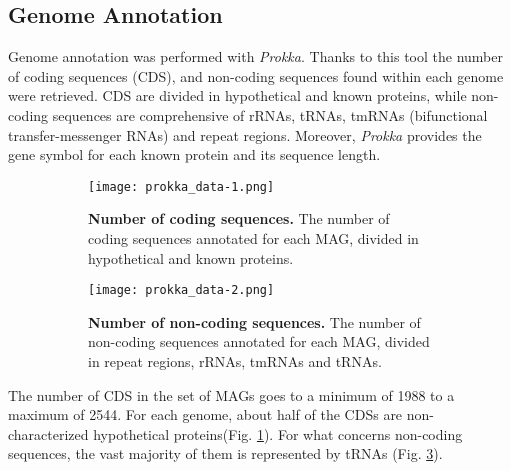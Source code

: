 \subsection*{Genome Annotation}
\graphicspath{{../Rscript/CMG_Rscript_files/figure-gfm/}}


Genome annotation was performed with \textit{Prokka}. Thanks to this tool the number of coding sequences (CDS), and non-coding sequences found within each genome were retrieved. CDS are divided in hypothetical and known proteins, while non-coding sequences are comprehensive of rRNAs, tRNAs, tmRNAs (bifunctional transfer-messenger RNAs) and repeat regions. Moreover, \textit{Prokka} provides the gene symbol for each known protein and its sequence length.

\begin{figure}[!h]
\centering
\begin{subfigure}{0.49\textwidth}
    \centering
    \texttt{[image: prokka\_data-1.png]}
    \caption{\footnotesize{\textbf{Number of coding sequences.} The number of coding sequences annotated for each MAG, divided in hypothetical and known proteins.}}
    \label{fig:prokka1}
\end{subfigure}
\begin{subfigure}{0.49\textwidth}
    \centering
    \texttt{[image: prokka\_data-2.png]}
    \caption{\footnotesize{\textbf{Number of non-coding sequences.} The number of non-coding sequences annotated for each MAG, divided in repeat regions, rRNAs, tmRNAs and tRNAs.}}
    \label{fig:prokka2}
\end{subfigure}
\caption{}
\end{figure}

The number of CDS in the set of MAGs goes to a minimum of 1988 to a maximum of 2544. For each genome, about half of the CDSs are non-characterized hypothetical proteins(Fig. \ref{fig:prokka1}). For what concerns non-coding sequences, the vast majority of them is represented by tRNAs (Fig. \ref{fig:prokka2}).